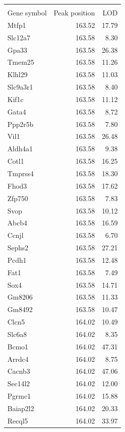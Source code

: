 \documentclass{article}
\begin{document}
\newpage
\begin{longtable}{lrr}
\hline \\

Gene symbol & Peak position & LOD \\ 
  \hline
Mtfp1 & 163.52 & 17.79 \\ 
  Slc12a7 & 163.58 & 8.30 \\ 
  Gpa33 & 163.58 & 26.38 \\ 
  Tmem25 & 163.58 & 11.26 \\ 
  Klhl29 & 163.58 & 11.03 \\ 
  Slc9a3r1 & 163.58 & 8.40 \\ 
  Kif1c & 163.58 & 11.12 \\ 
  Gata4 & 163.58 & 8.72 \\ 
  Ppp2r5b & 163.58 & 7.80 \\ 
  Vil1 & 163.58 & 26.48 \\ 
  Aldh4a1 & 163.58 & 9.38 \\ 
  Cotl1 & 163.58 & 16.25 \\ 
  Tmprss4 & 163.58 & 18.30 \\ 
  Fhod3 & 163.58 & 17.62 \\ 
  Zfp750 & 163.58 & 7.83 \\ 
  Svop & 163.58 & 10.12 \\ 
  Abcb4 & 163.58 & 16.59 \\ 
  Ccnjl & 163.58 & 6.70 \\ 
  Sephs2 & 163.58 & 27.21 \\ 
  Pcdh1 & 163.58 & 12.48 \\ 
  Fat1 & 163.58 & 7.49 \\ 
  Sox4 & 163.58 & 14.71 \\ 
  Gm8206 & 163.58 & 11.33 \\ 
  Gm8492 & 163.58 & 10.47 \\ 
  Clcn5 & 164.02 & 10.49 \\ 
  Slc6a8 & 164.02 & 8.35 \\ 
  Bcmo1 & 164.02 & 47.31 \\ 
  Arrdc4 & 164.02 & 8.75 \\ 
  Cacnb3 & 164.02 & 47.06 \\ 
  Sec14l2 & 164.02 & 12.00 \\ 
  Pgrmc1 & 164.02 & 15.88 \\ 
  Baiap2l2 & 164.02 & 20.33 \\ 
  Recql5 & 164.02 & 33.97 \\ 

\end{longtable}
\end{document}
